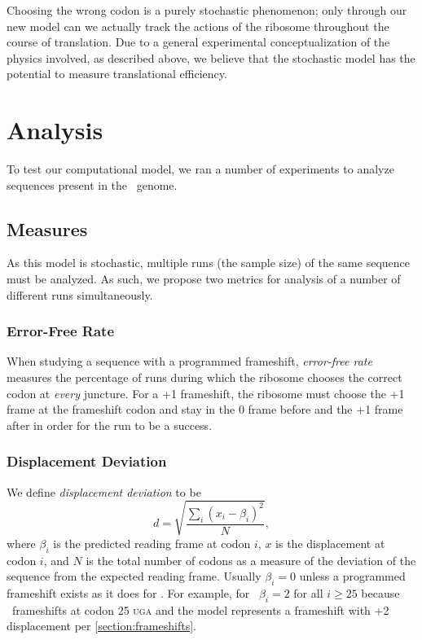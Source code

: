 \documentclass[12pt]{article}
\begin{document}
Choosing the wrong codon is a purely stochastic phenomenon; only through our new
model can we actually track the actions of the ribosome throughout the course
of translation.  Due to a general experimental conceptualization of the physics involved,
as described above, we believe that the stochastic model has the potential to 
measure translational efficiency.

\section{Analysis}
To test our computational model, we ran a number of
experiments to analyze sequences present in the \ecoli\ genome.

\subsection{Measures}
\label{section:metrics}

As this model is stochastic, multiple runs (the sample size) of the same sequence must be analyzed.
As such, we propose two metrics for analysis of a number of different runs 
simultaneously. 

\subsubsection{Error-Free Rate}
\label{section:efr}
When studying a
sequence with a programmed frameshift, \emph{error-free rate} measures the percentage of runs 
during which the ribosome chooses the correct codon
at \emph{every} juncture.  For a +1 frameshift, the ribosome must
choose the +1 frame at the frameshift codon and stay in the 0 frame before
and the +1 frame after in order for the run to be a success.

\subsubsection{Displacement Deviation}
\label{section:deviation}

We define \emph{displacement deviation} to be
\begin{equation}
    d = \sqrt{\frac{\sum_i (x_i - \beta_i)^2}{N}},
\end{equation}
where $\beta_i$ is the predicted reading frame at codon $i$, $x$ is
the displacement at codon $i$, and $N$ is the total number of codons
as a measure of the deviation of the sequence from the expected
reading frame.  Usually $\beta_i = 0$ unless a programmed frameshift
exists as it does for \prfB.  For example, for \prfB\ $\beta_i = 2$
for all $i \geq 25$ because \prfB\ frameshifts at codon 25
\textsc{uga} and the model represents a frameshift with +2
displacement per \autoref{section:frameshifts}.
\end{document}
